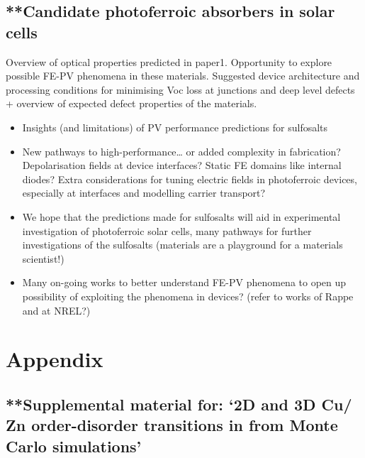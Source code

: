\documentclass[11pt, twoside]{report}
\begin{document}
\section{**Candidate photoferroic absorbers in solar cells}
Overview of optical properties predicted in paper1. Opportunity to explore possible FE-PV phenomena in these materials. Suggested device architecture and processing conditions for minimising Voc loss at junctions and deep level defects + overview of expected defect properties of the materials.
\begin{itemize}
\item Insights (and limitations) of PV performance predictions for sulfosalts
\item New pathways to high-performance… or added complexity in fabrication? Depolarisation fields at device interfaces? Static FE domains like internal diodes? Extra considerations for tuning electric fields in photoferroic devices, especially at interfaces and modelling carrier transport?
\item We hope that the predictions made for sulfosalts will aid in experimental investigation of photoferroic solar cells, many pathways for further investigations of the sulfosalts (materials are a playground for a materials scientist!)
\item Many on-going works to better understand FE-PV phenomena to open up possibility of exploiting the phenomena in devices? (refer to works of Rappe and at NREL?)
\end{itemize}






\appendix
\chapter{Appendix}

\section{**Supplemental material for: `2D and 3D Cu/ Zn order-disorder transitions in {\CZTS} from Monte Carlo simulations'}\label{eris1_appendix}

\end{document}
